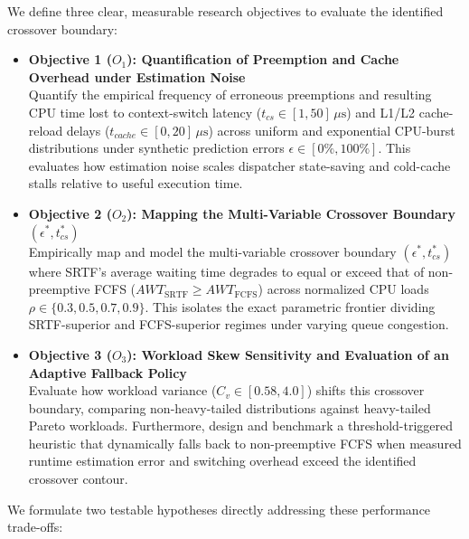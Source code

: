 \documentclass[11pt]{article}
\newcommand{\topicTitle}[1]{
    \vspace{0.35em}\noindent{\fontsize{11}{13.2}\selectfont \textbf{#1}}\par\vspace{0.2em}
}
\newcommand{\qLabel}[1]{
    {\fontsize{10.2}{12.2}\selectfont \textbf{#1}}
}
\begin{document}
We define three clear, measurable research objectives to evaluate the identified crossover boundary:
\begin{itemize}[leftmargin=1.2em, itemsep=0.35em, parsep=0pt]

    \item \qLabel{Objective 1 ($O_1$): Quantification of Preemption and Cache Overhead under Estimation Noise} \\
    Quantify the empirical frequency of erroneous preemptions and resulting CPU time lost to context-switch latency ($t_{cs} \in [1, 50]\,\mu\text{s}$) and L1/L2 cache-reload delays ($t_{cache} \in [0, 20]\,\mu\text{s}$) across uniform and exponential CPU-burst distributions under synthetic prediction errors $\epsilon \in [0\%, 100\%]$. This evaluates how estimation noise scales dispatcher state-saving and cold-cache stalls relative to useful execution time.

    \item \qLabel{Objective 2 ($O_2$): Mapping the Multi-Variable Crossover Boundary $(\epsilon^*, t_{cs}^*)$} \\
    Empirically map and model the multi-variable crossover boundary $(\epsilon^*, t_{cs}^*)$ where SRTF's average waiting time degrades to equal or exceed that of non-preemptive FCFS ($AWT_{\text{SRTF}} \ge AWT_{\text{FCFS}}$) across normalized CPU loads $\rho \in \{0.3, 0.5, 0.7, 0.9\}$. This isolates the exact parametric frontier dividing SRTF-superior and FCFS-superior regimes under varying queue congestion.

    \item \qLabel{Objective 3 ($O_3$): Workload Skew Sensitivity and Evaluation of an Adaptive Fallback Policy} \\
    Evaluate how workload variance ($C_v \in [0.58, 4.0]$) shifts this crossover boundary, comparing non-heavy-tailed distributions against heavy-tailed Pareto workloads. Furthermore, design and benchmark a threshold-triggered heuristic that dynamically falls back to non-preemptive FCFS when measured runtime estimation error and switching overhead exceed the identified crossover contour.

\end{itemize}

\vspace{0.35em}
\topicTitle{Task C: Research Hypotheses}

We formulate two testable hypotheses directly addressing these performance trade-offs:
\end{document}
